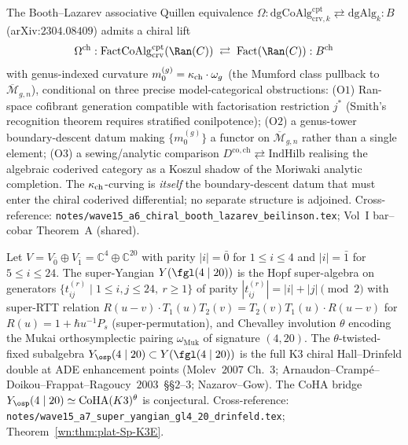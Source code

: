 \begin{conjecture}\ClaimStatusConjectured
\label{wn:conj:plat-w15-chiral-BL}
The Booth--Lazarev associative Quillen equivalence
$\Omega : \mathrm{dgCoAlg}^{\mathrm{cpt}}_{\mathrm{crv}, k}
\rightleftarrows \mathrm{dgAlg}_k : B$ (arXiv:$2304.08409$) admits a
chiral lift
\[
  \Omega^{\mathrm{ch}} : \mathrm{FactCoAlg}^{\mathrm{cpt}}_{\mathrm{crv}}(\Ran(C))
  \;\rightleftarrows\; \mathrm{Fact}(\Ran(C)) : B^{\mathrm{ch}}
\]
with genus-indexed curvature
$m_0^{(g)} = \kappa_{\mathrm{ch}} \cdot \omega_g$ (the Mumford class pullback to
$\overline{\mathcal{M}}_{g, n}$), conditional on three precise
model-categorical obstructions:
\textup{(O$1$)} Ran-space cofibrant generation compatible with
factorisation restriction $j^*$ (Smith's recognition theorem requires
stratified conilpotence);
\textup{(O$2$)} a genus-tower boundary-descent datum making
$\{m_0^{(g)}\}$ a functor on $\overline{\mathcal{M}}_{g, n}$ rather
than a single element;
\textup{(O$3$)} a sewing/analytic comparison
$D^{\mathrm{co}, \mathrm{ch}} \rightleftarrows \mathrm{IndHilb}$
realising the algebraic coderived category as a Koszul shadow of the
Moriwaki analytic completion.
The $\kappa_{\mathrm{ch}}$-curving is \emph{itself} the boundary-descent datum that
must enter the chiral coderived differential; no separate structure
is adjoined.
Cross-reference: \texttt{notes/wave15\_a6\_chiral\_booth\_lazarev\_beilinson.tex};
Vol~I bar--cobar Theorem~A (shared).
\end{conjecture}

\begin{theorem}\ClaimStatusTheorem
\label{wn:thm:plat-w15-super-yangian}
Let $V = V_{\bar 0} \oplus V_{\bar 1} = \mathbb{C}^4 \oplus \mathbb{C}^{20}$
with parity $|i| = \bar 0$ for $1 \leq i \leq 4$ and $|i| = \bar 1$
for $5 \leq i \leq 24$. The super-Yangian $Y(\fgl(4 \mid 20))$ is the
Hopf super-algebra on generators
$\{t^{(r)}_{ij} \mid 1 \leq i, j \leq 24,\ r \geq 1\}$ of parity
$|t^{(r)}_{ij}| = |i| + |j| \pmod 2$ with super-RTT relation
$R(u - v) \cdot T_1(u) T_2(v) = T_2(v) T_1(u) \cdot R(u - v)$ for
$R(u) = 1 + \hbar u^{-1} P_s$ (super-permutation), and Chevalley
involution $\theta$ encoding the Mukai orthosymplectic pairing
$\omega_{\mathrm{Muk}}$ of signature $(4, 20)$. The
$\theta$-twisted-fixed subalgebra $Y_{\osp}(4 \mid 20) \subset
Y(\fgl(4 \mid 20))$ is the full K$3$ chiral Hall--Drinfeld double at
ADE enhancement points (Molev~$2007$ Ch.~$3$;
Arnaudon--Cramp\'e--Doikou--Frappat--Ragoucy~$2003$~\S\S$2$--$3$;
Nazarov--Gow). The CoHA bridge
$Y_{\osp}(4 \mid 20) \simeq \mathrm{CoHA}(K3)^{\theta}$ is conjectural.
Cross-reference: \texttt{notes/wave15\_a7\_super\_yangian\_gl4\_20\_drinfeld.tex};
Theorem~\ref{wn:thm:plat-Sp-K3E}.
\end{theorem}

